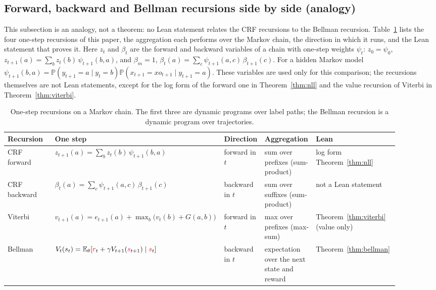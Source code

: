 \documentclass[11pt,a4paper]{article}
\newcommand{\E}{\mathbb{E}}
\newcommand{\Prb}{\mathbb{P}}
\newcommand{\rv}[1]{{\color{red}#1}}       %
\newcommand{\ra}[1]{{\color{magenta}#1}}   %
\newcommand{\sv}{\rv{s}}
\newcommand{\rw}{\rv{r}}
\begin{document}
\subsection{Forward, backward and Bellman recursions side by side (analogy)}
\label{sec:analogy}
This subsection is an analogy, not a theorem: no Lean statement relates the CRF recursions to the Bellman recursion.
Table~\ref{tab:rec} lists the four one-step recursions of this paper, the aggregation each performs over the Markov chain, the direction in which it runs, and the Lean statement that proves it.
Here $z_t$ and $\beta_t$ are the forward and backward variables of a chain with one-step weights $\psi_t$: $z_0=\psi_0$, $z_{t+1}(a)=\sum_bz_t(b)\,\psi_{t+1}(b,a)$, and $\beta_m=1$, $\beta_t(a)=\sum_c\psi_{t+1}(a,c)\,\beta_{t+1}(c)$.
For a hidden Markov model $\psi_{t+1}(b,a)=\Prb(y_{t+1}=a\mid y_t=b)\Prb(x_{t+1}=xo_{t+1}\mid y_{t+1}=a)$.
These variables are used only for this comparison; the recursions themselves are not Lean statements, except for the log form of the forward one in Theorem~\ref{thm:nll} and the value recursion of Viterbi in Theorem~\ref{thm:viterbi}.

\begin{table}[ht]
\centering
\footnotesize
\renewcommand{\arraystretch}{1.2}
\begin{tabular}{@{}>{\raggedright\arraybackslash}p{0.12\linewidth}>{\raggedright\arraybackslash}p{0.34\linewidth}>{\raggedright\arraybackslash}p{0.10\linewidth}>{\raggedright\arraybackslash}p{0.13\linewidth}>{\raggedright\arraybackslash}p{0.21\linewidth}@{}}
\toprule
Recursion & One step & Direction & Aggregation & Lean \\
\midrule
CRF forward & $z_{t+1}(a)=\sum_bz_t(b)\,\psi_{t+1}(b,a)$ & forward in $t$ & sum over prefixes (sum-product) & log form Theorem~\ref{thm:nll} \\
CRF backward & $\beta_t(a)=\sum_c\psi_{t+1}(a,c)\,\beta_{t+1}(c)$ & backward in $t$ & sum over suffixes (sum-product) & not a Lean statement \\
Viterbi & $v_{t+1}(a)=e_{t+1}(a)+\max_b\bigl(v_t(b)+G(a,b)\bigr)$ & forward in $t$ & max over prefixes (max-sum) & Theorem~\ref{thm:viterbi} (value only) \\
Bellman & $V_t(s_t)=\E_\theta[\rw_t+\gamma V_{t+1}(\ra{s}_{t+1})\mid\sv_t]$ & backward in $t$ & expectation over the next state and reward & Theorem~\ref{thm:bellman} \\
\bottomrule
\end{tabular}
\caption{One-step recursions on a Markov chain. The first three are dynamic programs over label paths; the Bellman recursion is a dynamic program over trajectories.}
\label{tab:rec}
\end{table}
\end{document}
